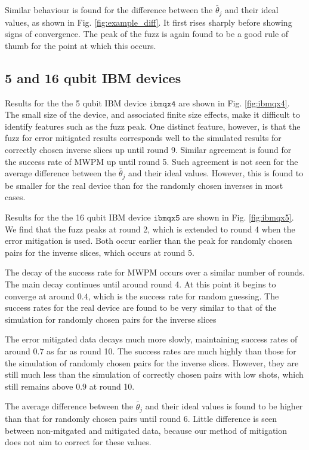 \documentclass[aps,prl,twocolumn,showpacs,preprintnumbers]{revtex4-1}
\begin{document}
Similar behaviour is found for the difference between the $\tilde{\theta_j}$ and their ideal values, as shown in Fig. \ref{fig:example_diff}. It first rises sharply before showing signs of convergence. The peak of the fuzz is again found to be a good rule of thumb for the point at which this occurs.

\subsection{5 and 16 qubit IBM devices}  \label{subsec:ibm}

Results for the the 5 qubit IBM device $\mathtt{ibmqx4}$ are shown in Fig. \ref{fig:ibmqx4}. The small size of the device, and associated finite size effects, make it difficult to identify features such as the fuzz peak. One distinct feature, however, is that the fuzz for error mitigated results corresponds well to the simulated results for correctly chosen inverse slices up until round 9. Similar agreement is found for the success rate of MWPM up until round 5. Such agreement is not seen for the average difference between the $\tilde{\theta_j}$ and their ideal values. However, this is found to be smaller for the real device than for the randomly chosen inverses in most cases.

Results for the the 16 qubit IBM device $\mathtt{ibmqx5}$ are shown in Fig. \ref{fig:ibmqx5}. We find that the fuzz peaks at round 2, which is extended to round 4 when the error mitigation is used. Both occur earlier than the peak for randomly chosen pairs for the inverse slices, which occurs at round 5.

The decay of the success rate for MWPM occurs over a similar number of rounds. The main decay continues until around round 4. At this point it begins to converge at around $0.4$, which is the success rate for random guessing. The success rates for the real device are found to be very similar to that of the simulation for randomly chosen pairs for the inverse slices

The error mitigated data decays much more slowly, maintaining success rates of around $0.7$ as far as round 10. The success rates are much highly than those for the simulation of randomly chosen pairs for the inverse slices. However, they are still much less than the simulation of correctly chosen pairs with low shots, which still remains above $0.9$ at round 10.

The average difference between the $\tilde{\theta_j}$ and their ideal values is found to be higher than that for randomly chosen pairs until round 6. Little difference is seen between non-mitgated and mitigated data, because our method of mitigation does not aim to correct for these values.
\end{document}
